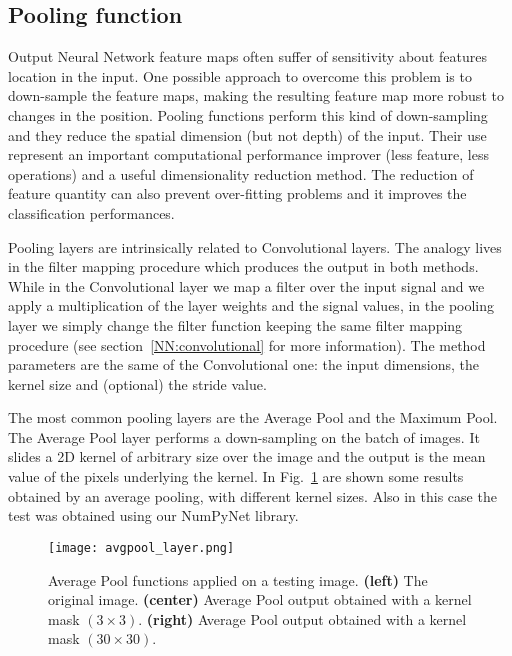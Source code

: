 \documentclass{standalone}
\begin{document}
\subsection[Pooling function]{Pooling function}\label{NN:pooling}

Output Neural Network feature maps often suffer of sensitivity about features location in the input.
One possible approach to overcome this problem is to down-sample the feature maps, making the resulting feature map more robust to changes in the position.
Pooling functions perform this kind of down-sampling and they reduce the spatial dimension (but not depth) of the input.
Their use represent an important computational performance improver (less feature, less operations) and a useful dimensionality reduction method.
The reduction of feature quantity can also prevent over-fitting problems and it improves the classification performances.

Pooling layers are intrinsically related to Convolutional layers.
The analogy lives in the filter mapping procedure which produces the output in both methods.
While in the Convolutional layer we map a filter over the input signal and we apply a multiplication of the layer weights and the signal values, in the pooling layer we simply change the filter function keeping the same filter mapping procedure (see section~\ref{NN:convolutional} for more information).
The method parameters are the same of the Convolutional one: the input dimensions, the kernel size and (optional) the stride value.

The most common pooling layers are the Average Pool and the Maximum Pool.
The Average Pool layer performs a down-sampling on the batch of images.
It slides a 2D kernel of arbitrary size over the image and the output is the mean value of the pixels underlying the kernel.
In Fig.~\ref{fig:avgpool} are shown some results obtained by an average pooling, with different kernel sizes.
Also in this case the test was obtained using our \textsf{NumPyNet} library.

\begin{center}
\begin{figure}[htbp]
\centering
\texttt{[image: avgpool\_layer.png]}
\caption{Average Pool functions applied on a testing image.
\textbf{(left)} The original image.
\textbf{(center)} Average Pool output obtained with a kernel mask $(3\times 3)$.
\textbf{(right)} Average Pool output obtained with a kernel mask $(30\times 30)$.
}
\label{fig:avgpool}
\end{figure}
\end{center}
\end{document}
